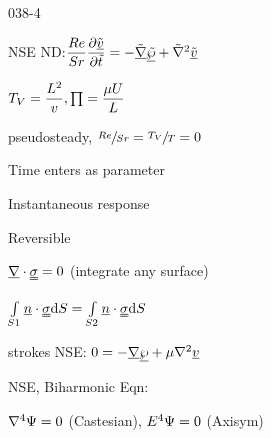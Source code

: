 \begin{mitframe}{038-4}

        
 \begin{listone}
\item NSE ND:$\dfrac{\reynolds}{\strouhal}\dfrac{\partial\uline{\tilde{\vvel}}}{\partial\tilde{t}}=-\tilde{\gradop}\uline{\tilde{\dynpress}}+\tilde{\nabla}^2\uline{\tilde{\vvel}}$

\item$ \Temp_{\vol}=\dfrac{\length^2}{\vvel}     , \prod=\dfrac{\chempot\intenergy}{\length}$

			\begin{listtwo}
            \item pseudosteady, $\sfrac {\reynolds}{\strouhal}=\sfrac{\Temp_{\vol}}{\Temp}=0$
            \item Time enters as parameter
            \item Instantaneous response
           \item Reversible
            
           		\begin{listthree}
                    
                    \item $\gradop\cdot\stresstens=0$   (integrate any surface)
                    
                    \item $\int\limits_{\entropy{1}}\uline{n}\cdot\stresstens\mathrm{d}\entropy=\int\limits_{\entropy{2}}\uline{n}\cdot\stresstens\mathrm{d}\entropy$
                    
				\end{listthree}

			\end{listtwo}
 
\item strokes NSE: $0=-\gradop\uline{\dynpress}+\chempot\nabla^2\uline{\vvel}$

\item NSE, Biharmonic Eqn:
			\begin{listtwo}
       			     \item $\nabla^4\streamfunc=0$ (Castesian),  $\energy^4\streamfunc=0$  (Axisym)

			\end{listtwo}
\end{listone}
\end{mitframe}